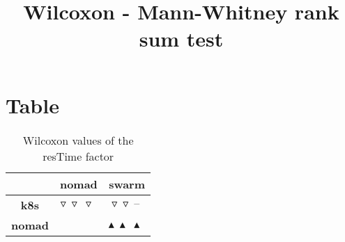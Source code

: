 \documentclass{article}
\title{Wilcoxon - Mann-Whitney rank sum test}
\author{}
\begin{document}
\maketitle
\section{Table}
\begin{table}[!htp]
  \caption{Wilcoxon values of the resTime factor}
  \label{table:resTime}
  \centering
  \begin{scriptsize}
  \begin{tabular}{c|cc}
      & \textbf{nomad} & \textbf{swarm} \\\hline
      \textbf{k8s} & $\triangledown\ \triangledown\ \triangledown\  $ & $ \triangledown\ \triangledown\ \text{--}\ $ \\
      \textbf{nomad} & $ $ & $ \blacktriangle\ \blacktriangle\ \blacktriangle\ $ \\
  \end{tabular}
  \end{scriptsize}
\end{table}
\end{document}
